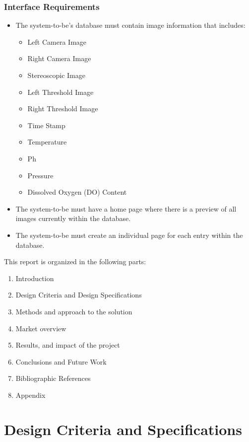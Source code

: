 \documentclass[12pt]{article}
\begin{document}
\subsubsection{Interface Requirements}
\begin{itemize}
	\item The system-to-be's database must contain image information that includes:
	      \begin{itemize}
		      \item Left Camera Image
		      \item Right Camera Image
		      \item Stereoscopic Image
		      \item Left Threshold Image
		      \item Right Threshold Image
		      \item Time Stamp
		      \item Temperature
		      \item Ph
		      \item Pressure
		      \item Dissolved Oxygen (DO) Content
	      \end{itemize}
	\item The system-to-be must have a home page where there is a preview of all images currently within the database.
	\item The system-to-be must create an individual page for each entry within the database.
\end{itemize}
This report is organized in the following parts:
\begin{enumerate}
	\item Introduction
	\item Design Criteria and Design Specifications
	\item Methods and approach to the solution
	\item Market overview
	\item Results, and impact of the project
	\item Conclusions and Future Work
	\item Bibliographic References
	\item Appendix
\end{enumerate}
\section{Design Criteria and Specifications}
\end{document}
